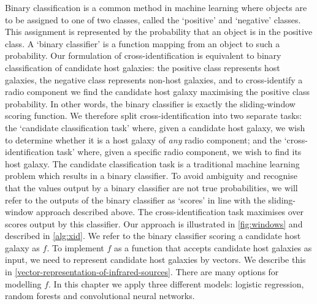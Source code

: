     {Binary classification is a common method in machine learning
    where objects are to be assigned to one of two classes,
    called the `positive' and `negative' classes. This assignment is
    represented by the probability that an object is in the positive class. A
    `binary classifier' is a function mapping from an object to such a
    probability. Our formulation of cross-identification is equivalent to
    binary classification of candidate host galaxies: the positive class
    represents host galaxies, the negative class represents non-host galaxies,
    and to cross-identify a radio component we find the candidate host galaxy
    maximising the positive class probability. In other words,
    the binary classifier is exactly the sliding-window scoring function. We therefore split
    cross-identification into two separate tasks: the `candidate
    classification task' where, given a candidate host galaxy, we wish to
    determine whether it is a host galaxy of \emph{any} radio component; and
    the `cross-identification task' where, given a specific radio
    component, we wish to find its host galaxy. The candidate classification task
    is a traditional machine learning problem which results in a binary
    classifier. To avoid ambiguity and recognise that the values output by a
    binary classifier are not true probabilities, we will refer to the outputs
    of the binary classifier as `scores' in line with the sliding-window approach
    described above. The cross-identification task maximises over scores
    output by this classifier. Our approach is illustrated in
    \autoref{fig:windows} and described in \autoref{alg:xid}. We refer to the
    binary classifier scoring a candidate host galaxy as
    $f$. To implement $f$ as a function that accepts candidate host galaxies
    as input, we need to represent candidate host galaxies by vectors. We
    describe this in \autoref{vector-representation-of-infrared-sources}.
    There are many options for modelling $f$. In this chapter we apply three
    different models: logistic regression, random forests and convolutional
    neural networks.}

